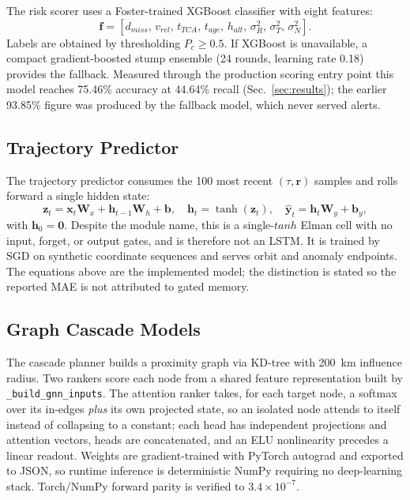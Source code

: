 \documentclass[conference]{IEEEtran}
\newcommand{\bvec}[1]{\mathbf{#1}}
\newcommand{\Pc}{P_c}
\begin{document}
The risk scorer uses a Foster-trained XGBoost classifier with eight features:
%
\begin{equation}
  \bvec{f} = [d_{miss},\, v_{rel},\, t_{TCA},\, t_{age},\, h_{alt},\,
               \sigma_R^2,\, \sigma_T^2,\, \sigma_N^2].
\end{equation}
%
Labels are obtained by thresholding $\Pc \geq 0.5$. If XGBoost is unavailable,
a compact gradient-boosted stump ensemble (24 rounds, learning rate 0.18)
provides the fallback. Measured through the production scoring entry point this
model reaches 75.46\% accuracy at 44.64\% recall (Sec.~\ref{sec:results}); the
earlier 93.85\% figure was produced by the fallback model, which never served
alerts.

\subsection{Trajectory Predictor}

The trajectory predictor consumes the 100 most recent $(\tau,\bvec{r})$ samples
and rolls forward a single hidden state:
%
\begin{equation}
  \bvec{z}_t = \bvec{x}_t\bvec{W}_x + \bvec{h}_{t-1}\bvec{W}_h + \bvec{b},
  \quad
  \bvec{h}_t = \tanh(\bvec{z}_t),
  \quad
  \hat{\bvec{y}}_t = \bvec{h}_t\bvec{W}_y + \bvec{b}_y,
  \label{eq:elman}
\end{equation}
%
with $\bvec{h}_0 = \bvec{0}$. Despite the module name, this is a single-$tanh$
Elman cell with no input, forget, or output gates, and is therefore not an LSTM.
It is trained by SGD on synthetic coordinate sequences and serves orbit and
anomaly endpoints. The equations above are the implemented model; the distinction
is stated so the reported MAE is not attributed to gated memory.

\subsection{Graph Cascade Models}

The cascade planner builds a proximity graph via KD-tree with 200~km influence
radius. Two rankers score each node from a shared feature representation built by
\texttt{\_build\_gnn\_inputs}. The attention ranker takes, for each target node,
a softmax over its in-edges \emph{plus} its own projected state, so an isolated
node attends to itself instead of collapsing to a constant; each head has
independent projections and attention vectors, heads are concatenated, and an
ELU nonlinearity precedes a linear readout. Weights are gradient-trained with
PyTorch autograd and exported to JSON, so runtime inference is deterministic
NumPy requiring no deep-learning stack. Torch/NumPy forward parity is verified to
$3.4\times10^{-7}$.
\end{document}
